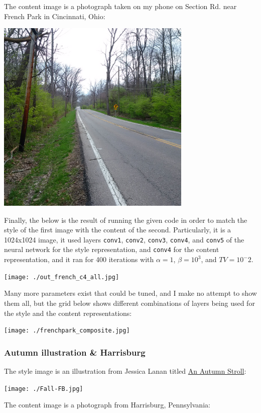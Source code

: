 \documentclass{article}
\begin{document}
The content image is a photograph taken on my phone on Section
Rd. near French Park in Cincinnati, Ohio:

\includegraphics[width=0.7\textwidth]{./french_park.jpg}

Finally, the below is the result of running the given code in order to match the
style of the first image with the content of the second.
Particularly, it is a 1024x1024 image, it used layers \texttt{conv1},
\texttt{conv2}, \texttt{conv3}, \texttt{conv4}, and \texttt{conv5} of
the neural network for the style representation, and \texttt{conv4}
for the content representation, and it ran for 400 iterations with
$\alpha=1$, $\beta=10^3$, and $TV=10^-2$.

\texttt{[image: ./out\_french\_c4\_all.jpg]}

Many more parameters exist that could be tuned, and I make no attempt
to show them all, but the grid below shows different combinations of
layers being used for the style and the content representations:

\texttt{[image: ./frenchpark\_composite.jpg]}

\subsubsection{Autumn illustration \& Harrisburg}

The style image is an illustration from Jessica Lanan titled
\href{http://jessicalanan.com/an-autumn-stroll/}{An Autumn Stroll}:

\texttt{[image: ./Fall-FB.jpg]}

The content image is a photograph from Harrisburg, Pennsylvania:
\end{document}
